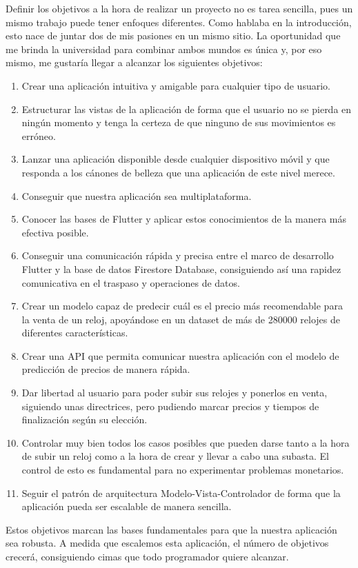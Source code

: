 
	Definir los objetivos a la hora de realizar un proyecto no es tarea sencilla, pues un mismo trabajo puede tener enfoques diferentes. Como hablaba en la introducción, esto nace de juntar dos de mis pasiones en un mismo sitio. La oportunidad que me brinda la universidad para combinar ambos mundos es única y, por eso mismo, me gustaría llegar a alcanzar los siguientes objetivos:

\begin{enumerate}
	\item Crear una aplicación intuitiva y amigable para cualquier tipo de usuario.
	\item Estructurar las vistas de la aplicación de forma que el usuario no se pierda en ningún momento y tenga la certeza de que ninguno de sus movimientos es erróneo.
	\item Lanzar una aplicación disponible desde cualquier dispositivo móvil y que responda a los cánones de belleza que una aplicación de este nivel merece.
	\item Conseguir que nuestra aplicación sea multiplataforma.
	\item Conocer las bases de Flutter y aplicar estos conocimientos de la manera más efectiva posible.
	\item Conseguir una comunicación rápida y precisa entre el marco de desarrollo Flutter y la base de datos Firestore Database, consiguiendo así una rapidez comunicativa en el traspaso y operaciones de datos.
	\item Crear un modelo capaz de predecir cuál es el precio más recomendable para la venta de un reloj, apoyándose en un dataset de más de 280000 relojes de diferentes características.
	\item Crear una API que permita comunicar nuestra aplicación con el modelo de predicción de precios de manera rápida.
	\item Dar libertad al usuario para poder subir sus relojes y ponerlos en venta, siguiendo unas directrices, pero pudiendo marcar precios y tiempos de finalización según su elección.
	\item Controlar muy bien todos los casos posibles que pueden darse tanto a la hora de subir un reloj como a la hora de crear y llevar a cabo una subasta. El control de esto es fundamental para no experimentar problemas monetarios.
	\item Seguir el patrón de arquitectura Modelo-Vista-Controlador de forma que la aplicación pueda ser escalable de manera sencilla.
\end{enumerate}

	Estos objetivos marcan las bases fundamentales para que la nuestra aplicación sea robusta. A medida que escalemos esta aplicación, el número de objetivos crecerá, consiguiendo cimas que todo programador quiere alcanzar.